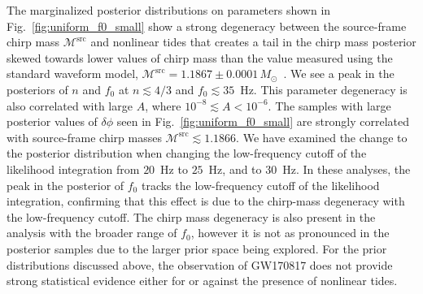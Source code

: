 The marginalized posterior distributions on parameters shown in Fig.~\ref{fig:uniform_f0_small} show a strong degeneracy between the source-frame chirp mass $\mathcal{M}^\textrm{src}$ and nonlinear tides that creates a tail in the chirp mass posterior skewed towards lower values of chirp mass than the value measured using the standard waveform model, $\mathcal{M}^\textrm{src} = 1.1867\pm0.0001\, M_\odot$~\citep{de2018tidal}. We see a peak in the posteriors of $n$ and $f_0$ at $n \lesssim 4/3$ and $f_0 \lesssim 35$~Hz. This parameter degeneracy is also correlated with large $A$, where $10^{-8} \lesssim A < 10^{-6}$. The samples with large posterior values of $\delta\phi$ seen in Fig.~\ref{fig:uniform_f0_small} are strongly correlated with source-frame chirp masses $\mathcal{M}^\textrm{src} \lesssim 1.1866.$ We have examined the change to the posterior distribution when changing the low-frequency cutoff of the likelihood integration from $20$~Hz to $25$~Hz, and to $30$~Hz. In these analyses, the peak in the posterior of $f_0$ tracks the low-frequency cutoff of the likelihood integration, confirming that this effect is due to the chirp-mass degeneracy with the low-frequency cutoff. The chirp mass degeneracy is also present in the analysis with the broader range of $f_0$, however it is not as pronounced in the posterior samples due to the larger prior space being explored. For the prior distributions discussed above, the observation of GW170817 does not provide strong statistical evidence either for or against the presence of nonlinear tides. 

